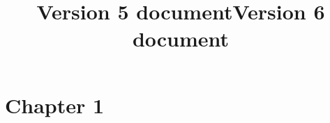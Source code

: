 \documentclass{book}
\title{Version 5 document}
\title{Version 6 document}
\begin{document}
\maketitle
    \chapter{Chapter 1}
    \iftoggle{cover}{%
      \section{Version 5 section filip}
    }{%
      \section{Version 6 section filip}
    }%
\end{document}

